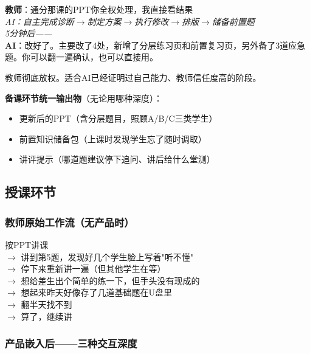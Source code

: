 \documentclass[11pt,a4paper]{article}
\begin{document}
\begin{dialogue}
\textbf{教师}：通分那课的PPT你全权处理，我直接看结果\\[6pt]
\textit{AI：自主完成诊断$\rightarrow$制定方案$\rightarrow$执行修改$\rightarrow$排版$\rightarrow$储备前置题}\\[6pt]
\textit{5分钟后——}\\[4pt]
\textbf{AI}：改好了。主要改了4处，新增了分层练习页和前置复习页，另外备了3道应急题。你可以翻一遍确认，也可以直接用。
\end{dialogue}

教师彻底放权。适合AI已经证明过自己能力、教师信任度高的阶段。

\bigskip
\noindent\textbf{备课环节统一输出物}（无论用哪种深度）：
\begin{itemize}[leftmargin=2em,nosep]
  \item[$\checkmark$] 更新后的PPT（含分层题目，照顾A/B/C三类学生）
  \item[$\checkmark$] 前置知识储备包（上课时发现学生忘了随时调取）
  \item[$\checkmark$] 讲评提示（哪道题建议停下追问、讲后给什么堂测）
\end{itemize}

\subsection{授课环节}

\subsubsection*{教师原始工作流（无产品时）}

\begin{oldflow}
按PPT讲课\\
$\rightarrow$ 讲到第5题，发现好几个学生脸上写着"听不懂"\\
$\rightarrow$ 停下来重新讲一遍（但其他学生在等）\\
$\rightarrow$ 想给差生出个简单的练一下，但手头没有现成的\\
$\rightarrow$ 想起来昨天好像存了几道基础题在U盘里\\
$\rightarrow$ 翻半天找不到\\
$\rightarrow$ 算了，继续讲
\end{oldflow}

\subsubsection*{产品嵌入后——三种交互深度}
\end{document}
